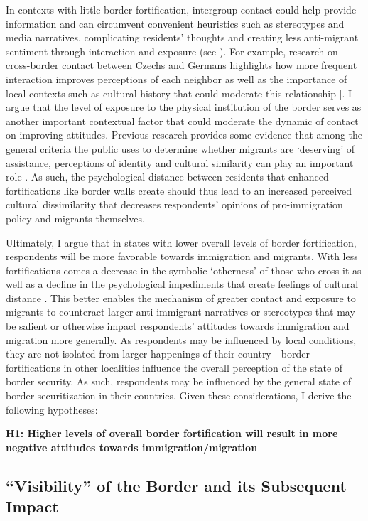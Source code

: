 \documentclass[12pt,]{article}
\begin{document}
In contexts with little border fortification, intergroup contact could
help provide information and can circumvent convenient heuristics such
as stereotypes and media narratives, complicating residents' thoughts
and creating less anti-migrant sentiment through interaction and
exposure (see \citet{pettigrew2006}). For example, research on
cross-border contact between Czechs and Germans highlights how more
frequent interaction improves perceptions of each neighbor as well as
the importance of local contexts such as cultural history that could
moderate this relationship {[}\citet{mirwaldt2010}. I argue that the
level of exposure to the physical institution of the border serves as
another important contextual factor that could moderate the dynamic of
contact on improving attitudes. Previous research provides some evidence
that among the general criteria the public uses to determine whether
migrants are `deserving' of assistance, perceptions of identity and
cultural similarity can play an important role
\citep{deconinck2020a, carmel2021}. As such, the psychological distance
between residents that enhanced fortifications like border walls create
should thus lead to an increased perceived cultural dissimilarity that
decreases respondents' opinions of pro-immigration policy and migrants
themselves.

Ultimately, I argue that in states with lower overall levels of border
fortification, respondents will be more favorable towards immigration
and migrants. With less fortifications comes a decrease in the symbolic
`otherness' of those who cross it \citep{jaramillo-dent2021} as well as
a decline in the psychological impediments that create feelings of
cultural distance \citep{mutz2022}. This better enables the mechanism of
greater contact and exposure to migrants to counteract larger
anti-immigrant narratives or stereotypes that may be salient or
otherwise impact respondents' attitudes towards immigration and
migration more generally. As respondents may be influenced by local
conditions, they are not isolated from larger happenings of their
country - border fortifications in other localities influence the
overall perception of the state of border security. As such, respondents
may be influenced by the general state of border securitization in their
countries. Given these considerations, I derive the following
hypotheses:

\textbf{H1: Higher levels of overall border fortification will result in
more negative attitudes towards immigration/migration}

\subsection{``Visibility'' of the Border and its Subsequent
Impact}\label{visibility-of-the-border-and-its-subsequent-impact}
\end{document}
